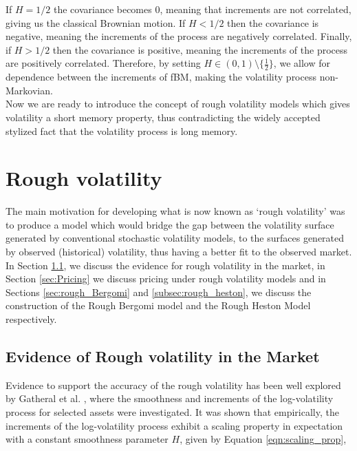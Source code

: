 \documentclass[12pt,oneside]{article}
\begin{document}
If $H=1/2$ the covariance becomes 0, meaning that increments are not correlated, giving us the classical Brownian motion. If $H<1/2$ then the covariance is negative, meaning the increments of the process are negatively correlated. Finally, if $H>1/2$ then the covariance is positive, meaning the increments of the process are positively correlated. Therefore, by setting $H\in(0,1)\setminus\{\frac{1}{2}\}$, we allow for dependence between the increments of fBM, making the volatility process non-Markovian.
\\

Now we are ready to introduce the concept of rough volatility models which gives volatility a short memory property, thus contradicting the widely accepted stylized fact that the volatility process is long memory. %

\section{Rough volatility}
\label{sec:rough_volatility}

The main motivation for developing what is now known as `rough volatility' was to produce a model which would bridge the gap between the volatility surface generated by conventional stochastic volatility models, to the surfaces generated by observed (historical) volatility, thus having a better fit to the observed market.
\\

In Section \ref{sec:rough_vol_evidence}, we discuss the evidence for rough volatility in the market, in Section \ref{sec:Pricing} we discuss pricing under rough volatility models and in Sections \ref{sec:rough_Bergomi} and \ref{subsec:rough_heston}, we discuss the construction of the Rough Bergomi model and the Rough Heston Model respectively. 

\subsection{Evidence of Rough volatility in the Market}
\label{sec:rough_vol_evidence}
 
Evidence to support the accuracy of the rough volatility  has been well explored by Gatheral et al. \cite{Gatheral2014}, where the smoothness and increments of the log-volatility process for selected assets were investigated. It was shown that empirically, the increments of the log-volatility process exhibit a scaling property in expectation with a constant smoothness parameter $H$, given by Equation \ref{eqn:scaling_prop}, 
\end{document}
